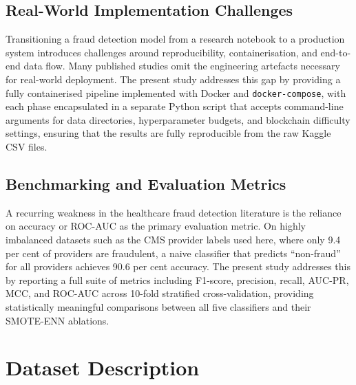 \subsection{Real-World Implementation Challenges}

Transitioning a fraud detection model from a research notebook to a production
system introduces challenges around reproducibility, containerisation, and
end-to-end data flow. Many published studies omit the engineering artefacts
necessary for real-world deployment. The present study addresses this gap by
providing a fully containerised pipeline implemented with Docker and
\texttt{docker-compose}, with each phase encapsulated in a separate Python script
that accepts command-line arguments for data directories, hyperparameter budgets,
and blockchain difficulty settings, ensuring that the results are fully
reproducible from the raw Kaggle CSV files.

\subsection{Benchmarking and Evaluation Metrics}

A recurring weakness in the healthcare fraud detection literature is the reliance
on accuracy or ROC-AUC as the primary evaluation metric. On highly imbalanced
datasets such as the CMS provider labels used here, where only 9.4 per cent of
providers are fraudulent, a naive classifier that predicts ``non-fraud'' for all
providers achieves 90.6 per cent accuracy. The present study addresses this by
reporting a full suite of metrics including F1-score, precision, recall,
AUC-PR, MCC, and ROC-AUC across 10-fold stratified cross-validation, providing
statistically meaningful comparisons between all five classifiers and their
SMOTE-ENN ablations.

\section{Dataset Description}

